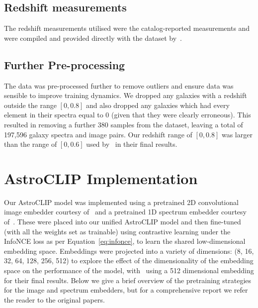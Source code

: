 \subsection{Redshift measurements}\label{subsec:redshift}
The redshift measurements utilised were the catalog-reported measurements and were compiled and provided directly with the
dataset by~\cite{astroclip}.

\subsection{Further Pre-processing}\label{subsec:pre-processing}
The data was pre-processed further to remove outliers and ensure data was sensible to improve training dynamics.
We dropped any galaxies with a redshift outside the range $[0, 0.8]$ and also dropped any galaxies which had every element
in their spectra equal to 0 (given that they were clearly erroneous).
This resulted in removing a further 380 samples from the dataset, leaving a total of 197,596 galaxy spectra and image pairs.
Our redshift range of $[0, 0.8]$ was larger than the range of $[0, 0.6]$ used by~\cite{astroclip} in their final results.

\section{AstroCLIP Implementation}\label{sec:astroclip-implementation}
Our AstroCLIP model was implemented using a pretrained 2D convolutional image embedder courtesy of~\cite{stein2021}
and a pretrained 1D spectrum embedder courtesy of~\cite{liang2023}.
These were placed into our unified AstroCLIP model and then fine-tuned (with all the weights set as trainable) using
contrastive learning under the InfoNCE loss as per Equation~\eqref{eq:infonce}, to learn the shared low-dimensional
embedding space.
Embeddings were projected into a variety of dimensions: (8, 16, 32, 64, 128, 256, 512) to explore the effect of the
dimensionality of the embedding space on the performance of the model, with~\cite{astroclip} using a 512 dimensional
embedding for their final results.
Below we give a brief overview of the pretraining strategies for the image and spectrum embedders, but for a
comprehensive report we refer the reader to the original papers.

